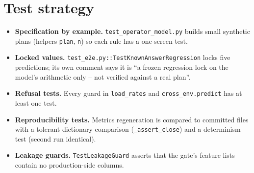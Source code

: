 \section{Test strategy}
\begin{itemize}
\item \textbf{Specification by example.} \texttt{test\_operator\_model.py} builds small synthetic plans (helpers \texttt{plan}, \texttt{n}) so each rule has a one-screen test.
\item \textbf{Locked values.} \texttt{test\_e2e.py::TestKnownAnswerRegression} locks five predictions; its own comment says it is ``a frozen regression lock on the model's arithmetic only -- not verified against a real plan''.
\item \textbf{Refusal tests.} Every guard in \texttt{load\_rates} and \texttt{cross\_env.predict} has at least one test.
\item \textbf{Reproducibility tests.} Metrics regeneration is compared to committed files with a tolerant dictionary comparison (\texttt{\_assert\_close}) and a determinism test (second run identical).
\item \textbf{Leakage guards.} \texttt{TestLeakageGuard} asserts that the gate's feature lists contain no production-side columns.
\end{itemize}

